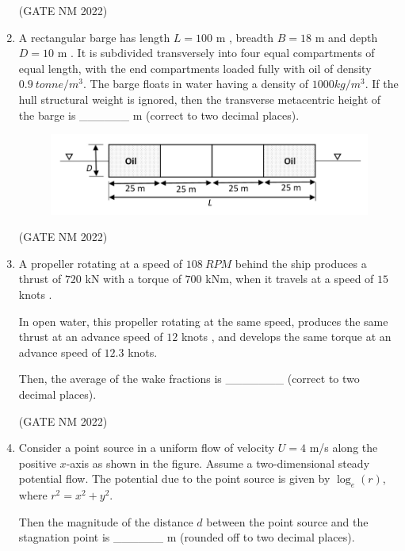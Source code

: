 \documentclass[journal,12pt,onecolumn]{IEEEtran}
\theoremstyle{remark}
\begin{document}
\begin{enumerate}
\hfill(GATE NM 2022)





\item 
A rectangular barge has length $L = 100$ m , breadth $B = 18 $ m  and depth $D = 10$ m .  
It is subdivided transversely into four equal compartments of equal length, with the end compartments loaded fully with oil of density $0.9\ tonne/m^3 $.  
The barge floats in water having a density of $1000  kg/m^3 $.  
If the hull structural weight is ignored, then the transverse metacentric height of the barge is  
\_\_\_\_\_\_  m (correct to two decimal places).

\begin{figure}[h]
\centering
	\includegraphics[width=0.5\columnwidth]{fig14}
	\caption{}
	\label{fig:placeholder}

\end{figure}

\hfill(GATE NM 2022)



\item  
A propeller rotating at a speed of $108\ RPM $ behind the ship produces a thrust of  
$720$ kN  with a torque of $700$ kNm, when it travels at a speed of  
$15$ knots .  

In open water, this propeller rotating at the same speed, produces the same thrust at an  
advance speed of $12$ knots , and develops the same torque at an advance speed  
of $12.3$ knots.  

Then, the average of the wake fractions is \_\_\_\_\_\_\_ (correct to two decimal places).


\hfill(GATE NM 2022)






\item  
Consider a point source in a uniform flow of velocity $U = 4$ m/s  along the positive $x$-axis as shown in the figure.  
Assume a two-dimensional steady potential flow.  
The potential due to the point source is given by $\log_e(r)$, where $r^2 = x^2 + y^2$.  

Then the magnitude of the distance $d$ between the point source and the stagnation point is  
\_\_\_\_\_\_ m  (rounded off to two decimal places).



\end{enumerate}
\end{document}
